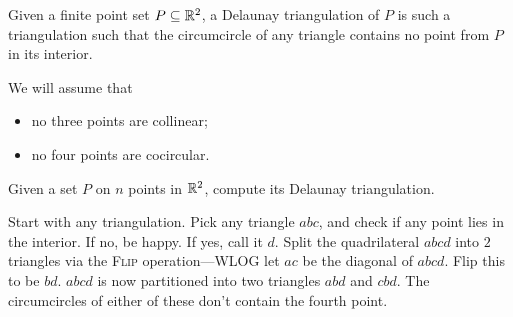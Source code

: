 \begin{definition} \label{def:delaunay}
    Given a finite point set $P \subseteq \mathbb{R}^2$, a Delaunay triangulation of
    $P$ is such a triangulation such that the circumcircle of any triangle
    contains no point from $P$ in its interior.
\end{definition}
We will assume that
\begin{itemize}
    \item no three points are collinear;
    \item no four points are cocircular.
\end{itemize}

\begin{question*}
    Given a set $P$ on $n$ points in $\mathbb{R}^2$, compute its Delaunay
    triangulation.
\end{question*}

\begin{solution}
    Start with any triangulation.
    Pick any triangle $abc$, and check if any point lies in the interior.
    If no, be happy.
    If yes, call it $d$.
    Split the quadrilateral $abcd$ into $2$ triangles via the \textsc{Flip}
    operation---WLOG let $ac$ be the diagonal of $abcd$.
    Flip this to be $bd$.
    $abcd$ is now partitioned into two triangles $abd$ and $cbd$.
    The circumcircles of either of these don't contain the fourth point.
\end{solution}
